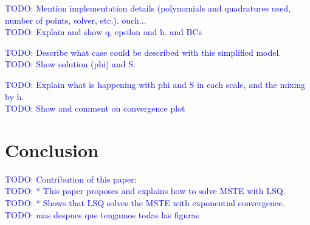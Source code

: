\documentclass{CFD2011}
\newcommand{\TODO}[1]{\textcolor{blue}{TODO: #1} \\}
\begin{document}
\TODO{Mention implementation details (polynomials and quadratures used, number of points, solver, etc.).  ouch... }

\TODO{Explain and show q, epsilon and h. and BCs}


\TODO{Describe what case could be described with this simplified model.}

\TODO{Show solution (phi) and S.}


\TODO{Explain what is happening with phi and S in each scale, and the mixing by h.}

\TODO{Show and comment on convergence plot}


\section{Conclusion}

\TODO{Contribution of this paper:}

\TODO{    * This paper proposes and explains how to solve MSTE with LSQ.}
\TODO{    * Shows that LSQ solves the MSTE with exponential convergence.}


\TODO{mas despues que tengamos todas las figuras}
\end{document}
